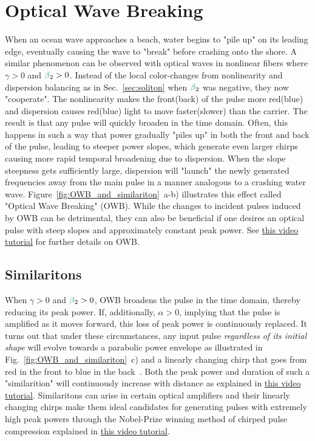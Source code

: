 




\section{Optical Wave Breaking}
When an ocean wave approaches a beach, water begins to "pile up" on its leading edge, eventually causing the wave to "break" before crashing onto the shore. A similar phenomenon can be observed with optical waves in nonlinear fibers where $\gamma>0$ and $\betag_2>0$. Instead of the local color-changes from nonlinearity and dispersion balancing as in Sec.~\ref{sec:soliton} when $\betag_2$ was negative, they now "cooperate". The nonlinearity makes the front(back) of the pulse more red(blue) and dispersion causes red(blue) light to move faster(slower) than the carrier. The result is that any pulse will quickly broaden in the time domain. Often, this happens in such a way that power gradually "piles up" in both the front and back of the pulse, leading to steeper power slopes, which generate even larger chirps causing more rapid temporal broadening due to dispersion. When the slope steepness gets sufficiently large, dispersion will "launch" the newly generated frequencies away from the main pulse in a manner analogous to a crashing water wave. Figure~\ref{fig:OWB_and_similariton}~a-b) illustrates this effect called "Optical Wave Breaking" (OWB). While the changes to incident pulses induced by OWB can be detrimental, they can also be beneficial if one desires an optical pulse with steep slopes and approximately constant peak power. See \href{https://youtu.be/XEx6lOf6f40}{this video tutorial} for further details on OWB. 

\subsection{Similaritons}
When $\gamma>0$ and $\betag_2>0$, OWB broadens the pulse in the time domain, thereby reducing its peak power. If, additionally, $\alpha>0$, implying that the pulse is amplified as it moves forward, this loss of peak power is continuously replaced. It turns out that under these circumstances, any input pulse \emph{regardless of its initial shape} will evolve towards a parabolic power envelope as illustrated in Fig.~\ref{fig:OWB_and_similariton}~c) and a linearly changing chirp that goes from red in the front to blue in the back~\cite{Similariton_evolution}. Both the peak power and duration of such a "similarition" will continuously increase with distance as explained in \href{https://youtu.be/ZtWIRaj5VV4}{this video tutorial}. Similaritons can arise in certain optical amplifiers and their linearly changing chirps make them ideal candidates for generating pulses with extremely high peak powers through the Nobel-Prize winning method of chirped pulse compression explained in \href{https://youtu.be/Eh5CHRWFT-M}{this video tutorial}.   

